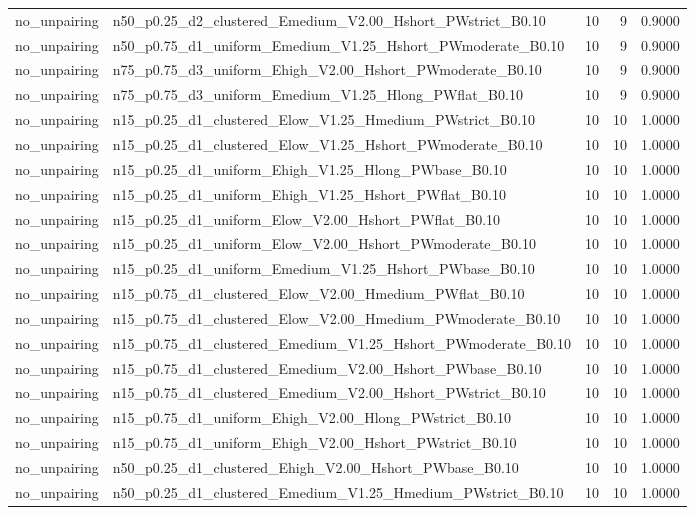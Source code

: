 \begin{tabular}{llrrr}
no_unpairing & n50_p0.25_d2_clustered_Emedium_V2.00_Hshort_PWstrict_B0.10 & 10 & 9 & 0.9000 \\
no_unpairing & n50_p0.75_d1_uniform_Emedium_V1.25_Hshort_PWmoderate_B0.10 & 10 & 9 & 0.9000 \\
no_unpairing & n75_p0.75_d3_uniform_Ehigh_V2.00_Hshort_PWmoderate_B0.10 & 10 & 9 & 0.9000 \\
no_unpairing & n75_p0.75_d3_uniform_Emedium_V1.25_Hlong_PWflat_B0.10 & 10 & 9 & 0.9000 \\
no_unpairing & n15_p0.25_d1_clustered_Elow_V1.25_Hmedium_PWstrict_B0.10 & 10 & 10 & 1.0000 \\
no_unpairing & n15_p0.25_d1_clustered_Elow_V1.25_Hshort_PWmoderate_B0.10 & 10 & 10 & 1.0000 \\
no_unpairing & n15_p0.25_d1_uniform_Ehigh_V1.25_Hlong_PWbase_B0.10 & 10 & 10 & 1.0000 \\
no_unpairing & n15_p0.25_d1_uniform_Ehigh_V1.25_Hshort_PWflat_B0.10 & 10 & 10 & 1.0000 \\
no_unpairing & n15_p0.25_d1_uniform_Elow_V2.00_Hshort_PWflat_B0.10 & 10 & 10 & 1.0000 \\
no_unpairing & n15_p0.25_d1_uniform_Elow_V2.00_Hshort_PWmoderate_B0.10 & 10 & 10 & 1.0000 \\
no_unpairing & n15_p0.25_d1_uniform_Emedium_V1.25_Hshort_PWbase_B0.10 & 10 & 10 & 1.0000 \\
no_unpairing & n15_p0.75_d1_clustered_Elow_V2.00_Hmedium_PWflat_B0.10 & 10 & 10 & 1.0000 \\
no_unpairing & n15_p0.75_d1_clustered_Elow_V2.00_Hmedium_PWmoderate_B0.10 & 10 & 10 & 1.0000 \\
no_unpairing & n15_p0.75_d1_clustered_Emedium_V1.25_Hshort_PWmoderate_B0.10 & 10 & 10 & 1.0000 \\
no_unpairing & n15_p0.75_d1_clustered_Emedium_V2.00_Hshort_PWbase_B0.10 & 10 & 10 & 1.0000 \\
no_unpairing & n15_p0.75_d1_clustered_Emedium_V2.00_Hshort_PWstrict_B0.10 & 10 & 10 & 1.0000 \\
no_unpairing & n15_p0.75_d1_uniform_Ehigh_V2.00_Hlong_PWstrict_B0.10 & 10 & 10 & 1.0000 \\
no_unpairing & n15_p0.75_d1_uniform_Ehigh_V2.00_Hshort_PWstrict_B0.10 & 10 & 10 & 1.0000 \\
no_unpairing & n50_p0.25_d1_clustered_Ehigh_V2.00_Hshort_PWbase_B0.10 & 10 & 10 & 1.0000 \\
no_unpairing & n50_p0.25_d1_clustered_Emedium_V1.25_Hmedium_PWstrict_B0.10 & 10 & 10 & 1.0000 \\

\end{tabular}

